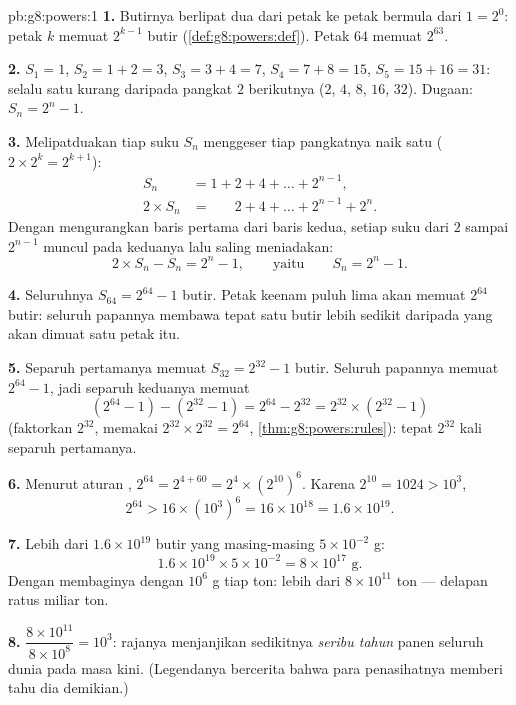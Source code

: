 \begin{solution}{pb:g8:powers:1}
\textbf{1.} Butirnya berlipat dua dari petak ke petak bermula dari
$1 = 2^0$: petak $k$ memuat $2^{k-1}$ butir
(\cref{def:g8:powers:def}). Petak $64$ memuat $2^{63}$.

\textbf{2.} $S_1 = 1$, $S_2 = 1 + 2 = 3$, $S_3 = 3 + 4 = 7$,
$S_4 = 7 + 8 = 15$, $S_5 = 15 + 16 = 31$: selalu satu kurang daripada
pangkat $2$ berikutnya ($2$, $4$, $8$, $16$, $32$). Dugaan:
$S_n = 2^n - 1$.

\textbf{3.} Melipatduakan tiap suku $S_n$ menggeser tiap pangkatnya
naik satu ($2 \times 2^{k} = 2^{k+1}$):
\begin{align*}
S_n &= 1 + 2 + 4 + \dots + 2^{n-1}, \\
2 \times S_n &= \phantom{1 + {}} 2 + 4 + \dots + 2^{n-1} + 2^n .
\end{align*}
Dengan mengurangkan baris pertama dari baris kedua, setiap suku dari
$2$ sampai $2^{n-1}$ muncul pada keduanya lalu saling meniadakan:
\[
2 \times S_n - S_n = 2^n - 1,
\qquad\text{yaitu}\qquad
S_n = 2^n - 1 .
\]

\textbf{4.} Seluruhnya $S_{64} = 2^{64} - 1$ butir. Petak keenam
puluh lima akan memuat $2^{64}$ butir: seluruh papannya membawa tepat
satu butir lebih sedikit daripada yang akan dimuat satu petak itu.

\textbf{5.} Separuh pertamanya memuat $S_{32} = 2^{32} - 1$ butir.
Seluruh papannya memuat $2^{64} - 1$, jadi separuh keduanya memuat
\[
\left(2^{64} - 1\right) - \left(2^{32} - 1\right)
= 2^{64} - 2^{32}
= 2^{32} \times \left(2^{32} - 1\right)
\]
(faktorkan $2^{32}$, memakai $2^{32} \times 2^{32} = 2^{64}$,
\cref{thm:g8:powers:rules}): tepat $2^{32}$ kali separuh
pertamanya.

\textbf{6.} Menurut aturan , $2^{64} = 2^{4 + 60} =
2^4 \times \left(2^{10}\right)^6$. Karena $2^{10} = 1024 > 10^3$,
\[
2^{64} > 16 \times \left(10^3\right)^6 = 16 \times 10^{18}
= 1.6 \times 10^{19} .
\]

\textbf{7.} Lebih dari $1.6 \times 10^{19}$ butir yang masing-masing
$5 \times 10^{-2}$ g:
\[
1.6 \times 10^{19} \times 5 \times 10^{-2}
= 8 \times 10^{17} \text{ g} .
\]
Dengan membaginya dengan $10^6$ g tiap ton: lebih dari
$8 \times 10^{11}$ ton --- delapan ratus miliar ton.

\textbf{8.} $\dfrac{8 \times 10^{11}}{8 \times 10^{8}} = 10^3$:
rajanya menjanjikan sedikitnya \emph{seribu tahun} panen seluruh
dunia pada masa kini. (Legendanya bercerita bahwa para penasihatnya
memberi tahu dia demikian.)


\end{solution}
